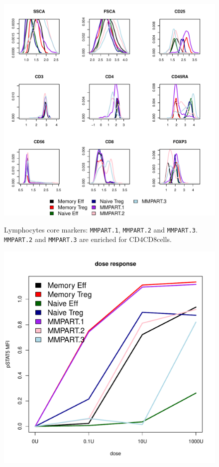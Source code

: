 %
\begin{figure}
\centering
\begin{minipage}{.9\textwidth}
\includegraphics[width=\linewidth]{figures/mmpart-lymphocytes-clusters}
\end{minipage}
{ Lymphocytes core markers: \texttt{MMPART.1}, \texttt{MMPART.2} and \texttt{MMPART.3}. }
{ \texttt{MMPART.2} and \texttt{MMPART.3} are enriched for CD4\negative CD8\positive cells.  }
%
\begin{minipage}{.5\textwidth}
  \includegraphics[width=\linewidth]{figures/mmpart-lymphocytes-dose-response}

\end{minipage}
\end{figure}
